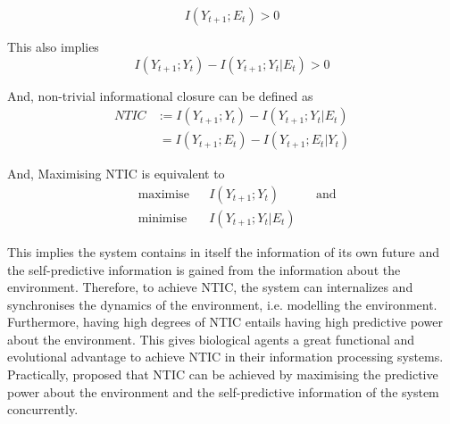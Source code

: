 \documentclass[utf8]{article}
\begin{document}
				\begin{equation}
				I(Y_{t+1};E_{t}) > 0
				\end{equation}
			
			\noindent
			This also implies
				\begin{equation}
					I(Y_{t+1};Y_{t})-I(Y_{t+1};Y_{t}|E_{t}) > 0
				\end{equation}
			
			
			
			\noindent 
			And, non-trivial informational closure can be defined as 		
				\begin{equation}
				\left.\begin{array}
				{rl}{NTIC} & {:=I(Y_{t+1};Y_{t})-I(Y_{t+1};Y_{t}|E_{t})}\\
				{ } & {\ =I(Y_{t+1};E_{t})-I(Y_{t+1};E_{t}|Y_{t})}
				\end{array} \right.
				\end{equation}
				
				
			\noindent 
			And, Maximising NTIC is equivalent to
				\begin{equation}\label{eq:nticObjective}
				\begin{aligned}
				& \text{maximise} & { } & I(Y_{t+1};Y_{t}) & { } & \text{and} \\
				& \text{minimise} & { } & I(Y_{t+1};Y_{t}|E_{t}) & { }
				\end{aligned}
				\end{equation}
				
			\noindent
			This implies the system contains in itself the information of its own future and the self-predictive information is gained from the information about the environment. Therefore, to achieve NTIC, the system can internalizes and synchronises the dynamics of the environment, i.e. modelling the environment. Furthermore, having high degrees of NTIC entails having high predictive power about the environment. This gives biological agents a great functional and evolutional advantage to achieve NTIC in their information processing systems. Practically, \cite{guttenberg2016neural} proposed that NTIC can be achieved by maximising the predictive power about the environment and the self-predictive information of the system concurrently.
			
\end{document}
